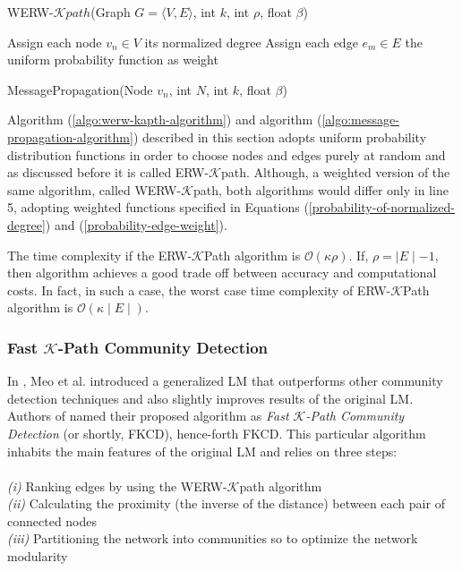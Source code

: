 {\begin{algorithm}[ht!]
	\caption{WERW-$\mathcal{K}path$(Graph $G = \langle V, E\rangle$, int $k$, int $\rho$, float $\beta$)}
	\label{algo:werw-kapth-algorithm}
	\SetAlgoLined
	\DontPrintSemicolon
	Assign each node $v_n \in V$ its normalized degree\;
	Assign each edge $e_m \in E$ the uniform probability function as weight\;
\end{algorithm}
\begin{algorithm}[ht!]
	\caption{MessagePropagation(Node $v_n$, int $N$, int $k$, float $\beta$)}
	\label{algo:message-propagation-algorithm}
	\SetAlgoLined
	\DontPrintSemicolon
\end{algorithm}
Algorithm (\ref{algo:werw-kapth-algorithm}) and algorithm (\ref{algo:message-propagation-algorithm}) described in this section adopts uniform probability distribution functions in order to choose nodes and edges purely at random and as discussed before it is called ERW-$\mathcal{K}$path. Although, a weighted version of the same algorithm, called WERW-$\mathcal{K}$path, both algorithms would differ only in line 5,  adopting weighted functions specified in Equations (\ref{probability-of-normalized-degree}) and (\ref{probability-edge-weight}).

The time complexity if the ERW-$\mathcal{K}$Path algorithm is $\mathcal{O}(\kappa \rho)$. If, $\rho = \mid E \mid - 1$, then algorithm achieves a good trade off between accuracy and computational costs. In fact, in such a case, the worst case time complexity of ERW-$\mathcal{K}$Path algorithm is $\mathcal{O}(\kappa \mid E \mid)$.

\subsubsection*{Fast $\mathcal{K}$-Path Community Detection}
In \cite{ref-28}, Meo et al. introduced a generalized LM \cite{ref-27} that outperforms other community detection techniques and also slightly improves results of the original LM. Authors of \cite{ref-28} named their proposed algorithm as \textit{Fast $\mathcal{K}$-Path Community Detection} (or shortly, FKCD), hence-forth FKCD. This particular algorithm inhabits the main features of the original LM and relies on three steps:\\\\
\textit{(i)} Ranking edges by using the WERW-$\mathcal{K}$path algorithm\\
\textit{(ii)} Calculating the proximity (the inverse of the distance) between each pair of connected nodes\\
\textit{(iii)} Partitioning the network into communities so to optimize the network modularity \cite{ref-1}

}
